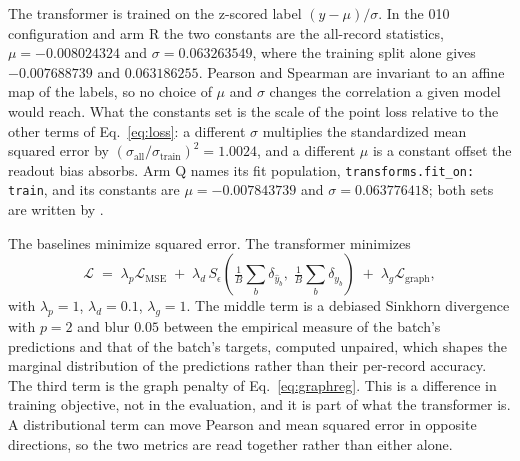 The transformer is trained on the z-scored label $(y - \mu) / \sigma$. In the 010
configuration and arm R the two constants are the all-record statistics,
$\mu = -0.008024324$ and $\sigma = 0.063263549$, where the training split alone
gives $-0.007688739$ and $0.063186255$. Pearson and Spearman are invariant to an
affine map of the labels, so no choice of $\mu$ and $\sigma$ changes the correlation
a given model would reach. What the constants set is the scale of the point loss
relative to the other terms of Eq.~\ref{eq:loss}: a different $\sigma$ multiplies
the standardized mean squared error by $(\sigma_{\mathrm{all}} /
\sigma_{\mathrm{train}})^2 = 1.0024$, and a different $\mu$ is a constant offset the
readout bias absorbs. Arm Q names its fit population, \texttt{transforms.fit\_on:
train}, and its constants are $\mu = -0.007843739$ and $\sigma = 0.063776418$; both
sets are written by
.

The baselines minimize squared error. The transformer minimizes
%
\begin{equation}
  \mathcal{L} \;=\; \lambda_p \mathcal{L}_{\mathrm{MSE}}
  \;+\; \lambda_d\, S_{\epsilon}\!\left(
    \tfrac{1}{B}\textstyle\sum_b \delta_{\hat{y}_b},\;
    \tfrac{1}{B}\textstyle\sum_b \delta_{y_b}\right)
  \;+\; \lambda_g \mathcal{L}_{\mathrm{graph}},
  \label{eq:loss}
\end{equation}
%
with $\lambda_p = 1$, $\lambda_d = 0.1$, $\lambda_g = 1$. The middle term is a
debiased Sinkhorn divergence with $p = 2$ and blur $0.05$ between the empirical
measure of the batch's predictions and that of the batch's targets, computed
unpaired, which shapes the marginal distribution of the predictions rather than
their per-record accuracy. The third term is the graph penalty of
Eq.~\ref{eq:graphreg}. This is a difference in training objective, not in the
evaluation, and it is part of what the transformer is. A distributional term can
move Pearson and mean squared error in opposite directions, so the two metrics are
read together rather than either alone.


